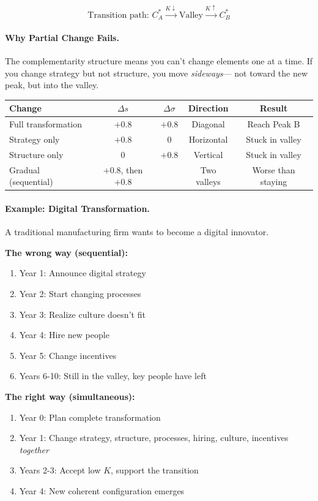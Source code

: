 \begin{equation}
  \text{Transition path: } 
  C^*_A \xrightarrow{K \downarrow} \text{Valley} 
        \xrightarrow{K \uparrow} C^*_B
\end{equation}

\paragraph{Why Partial Change Fails.}
The complementarity structure means you can't change elements one at a time.
If you change strategy but not structure, you move \emph{sideways}---
not toward the new peak, but into the valley.

\begin{center}
\renewcommand{\arraystretch}{1.2}
\begin{tabular}{lcccc}
\hline
\textbf{Change} & $\Delta s$ & $\Delta \sigma$ & Direction & Result \\
\hline
Full transformation & $+0.8$ & $+0.8$ & Diagonal & Reach Peak B \\
Strategy only & $+0.8$ & $0$ & Horizontal & Stuck in valley \\
Structure only & $0$ & $+0.8$ & Vertical & Stuck in valley \\
Gradual (sequential) & $+0.8$, then $+0.8$ & & Two valleys & Worse than staying \\
\hline
\end{tabular}
\end{center}

\paragraph{Example: Digital Transformation.}
A traditional manufacturing firm wants to become a digital innovator.

\textbf{The wrong way (sequential):}
\begin{enumerate}
  \item Year 1: Announce digital strategy
  \item Year 2: Start changing processes
  \item Year 3: Realize culture doesn't fit
  \item Year 4: Hire new people
  \item Year 5: Change incentives
  \item Years 6-10: Still in the valley, key people have left
\end{enumerate}

\textbf{The right way (simultaneous):}
\begin{enumerate}
  \item Year 0: Plan complete transformation
  \item Year 1: Change strategy, structure, processes, hiring, culture, incentives \emph{together}
  \item Years 2-3: Accept low $K$, support the transition
  \item Year 4: New coherent configuration emerges
\end{enumerate}

